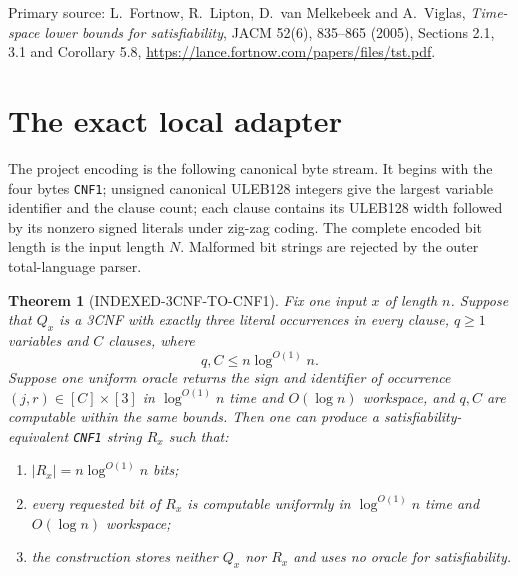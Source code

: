 \documentclass[11pt]{article}
\newtheorem{theorem}{Theorem}
\begin{document}
Primary source: L.~Fortnow, R.~Lipton, D.~van Melkebeek and A.~Viglas,
\emph{Time-space lower bounds for satisfiability}, JACM 52(6), 835--865
(2005), Sections 2.1, 3.1 and Corollary 5.8,
\url{https://lance.fortnow.com/papers/files/tst.pdf}.

\section{The exact local adapter}

The project encoding is the following canonical byte stream.  It begins with
the four bytes \texttt{CNF1}; unsigned canonical ULEB128 integers give the
largest variable identifier and the clause count; each clause contains its
ULEB128 width followed by its nonzero signed literals under zig-zag coding.
The complete encoded bit length is the input length $N$.  Malformed bit
strings are rejected by the outer total-language parser.

\begin{theorem}[INDEXED-3CNF-TO-CNF1]\label{thm:adapter}
Fix one input $x$ of length $n$.  Suppose that $Q_x$ is a 3CNF with exactly
three literal occurrences in every clause, $q\ge1$ variables and $C$ clauses,
where
\[
 q,C\le n\log^{O(1)}n.                                      \tag{4}
\]
Suppose one uniform oracle returns the sign and identifier of occurrence
$(j,r)\in[C]\times[3]$ in $\log^{O(1)}n$ time and $O(\log n)$ workspace, and
$q,C$ are computable within the same bounds.  Then one can produce a
satisfiability-equivalent \texttt{CNF1} string $R_x$ such that:
\begin{enumerate}
\item $|R_x|=n\log^{O(1)}n$ bits;
\item every requested bit of $R_x$ is computable uniformly in
      $\log^{O(1)}n$ time and $O(\log n)$ workspace;
\item the construction stores neither $Q_x$ nor $R_x$ and uses no oracle for
      satisfiability.
\end{enumerate}
\end{theorem}
\end{document}
